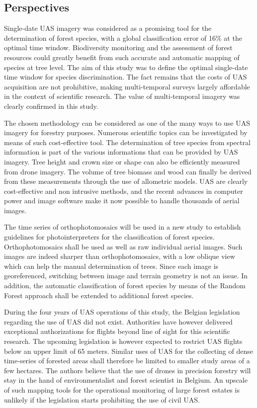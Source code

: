 \documentclass[remotesensing,article,submit,moreauthors,pdftex,12pt,a4paper]{mdpi} %
\begin{document}
\subsection{Perspectives}

Single-date UAS imagery was considered as a promising tool for the determination of forest species, with a global classification error of 16\% at the optimal time window. Biodiversity monitoring and the assessment of forest resources could greatly benefit from such accurate and automatic mapping of species at tree level. The aim of this study was to define the optimal single-date time window for species discrimination. The fact remains that the costs of UAS acquisition are not prohibitive, making multi-temporal surveys largely affordable in the context of scientific research. The value of multi-temporal imagery was clearly confirmed in this study.

The chosen methodology can be considered as one of the many ways to use UAS imagery for forestry purposes. Numerous scientific topics can be investigated by means of such cost-effective tool. The determination of tree species from spectral information is part of the various informations that can be provided by UAS imagery. Tree height and crown size or shape can also be efficiently measured from drone imagery. The volume of tree biomass and wood can finally be derived from these measurements through the use of allometric models. UAS are clearly cost-effective and non intrusive methods, and the recent advances in computer power and image software make it now possible to handle thousands of aerial images.

The time series of orthophotomosaics will be used in a new study to establish guidelines for photointerpreters for the classification of forest species. Orthophotomosaics shall be used as well as raw individual aerial images. Such images are indeed sharper than orthophotomosaics, with a low oblique view which can help the manual determination of trees. Since each image is georeferenced, switching between image and terrain geometry is not an issue. In addition, the automatic classification of forest species by means of the Random Forest approach shall be extended to additional forest species.

During the four years of UAS operations of this study, the Belgian legislation regarding the use of UAS did not exist. 
Authorities have however delivered exceptional authorizations for flights beyond line of sight for this scientific research. 
The upcoming legislation is however expected to restrict UAS flights below an upper limit of 65 meters. 
Similar uses of UAS for the collecting of dense time-series of forested areas shall therefore be limited to smaller study areas of a few hectares. 
The authors believe that the use of drones in precision forestry will stay in the hand of environmentalist and forest scientist in Belgium. 
An upscale of such mapping tools for the operational monitoring of large forest estates is unlikely if the legislation starts prohibiting the use of civil UAS. 
\end{document}

